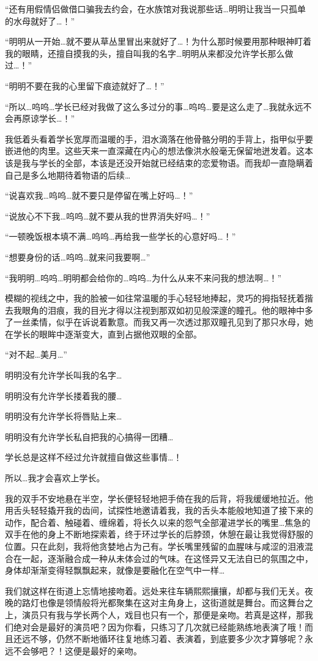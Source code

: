 “还有用假情侣做借口骗我去约会，在水族馆对我说那些话…明明让我当一只孤单的水母就好了…！”

“明明从一开始…就不要从草丛里冒出来就好了…！为什么那时候要用那种眼神盯着我的眼睛，还擅自摸我的头，擅自叫我的名字…明明从来都没允许学长那么做过…！”

“明明不要在我的心里留下痕迹就好了…！”

“所以…呜呜…学长已经对我做了这么多过分的事…呜呜…要是这么走了…我就永远不会再原谅学长…！”

我低着头看着学长宽厚而温暖的手，泪水滴落在他骨骼分明的手背上，指甲似乎要嵌进他的肉里。这些天来一直深藏在内心的想法像洪水般毫无保留地迸发着。这本该是我与学长的全部，本该是还没开始就已经结束的恋爱物语。而我却一直隐瞒着自己是多么地期待着物语的后续…

“说喜欢我…呜呜…就不要只是停留在嘴上好吗…！”

“说放心不下我…呜呜…就不要从我的世界消失好吗…！”

“一顿晚饭根本填不满…呜呜…再给我一些学长的心意好吗…！”

“想要身份的话…呜呜…就来问我要啊…”

“我明明…呜呜…明明都会给你的…呜呜…为什么从来不来问我的想法啊…！”

模糊的视线之中，我的脸被一如往常温暖的手心轻轻地捧起，灵巧的拇指轻抚着揩去我眼角的泪痕，我的目光才得以注视到那双如初见般深邃的瞳孔。他的眼神中多了一丝柔情，似乎在诉说着歉意。而我又再一次透过那双瞳孔见到了那只水母，她在学长的眼眸中逐渐变大，直到占据他双眼的全部。

“对不起…美月…”

明明没有允许学长叫我的名字…

明明没有允许学长搂着我的腰…

明明没有允许学长将唇贴上来…

明明没有允许学长私自把我的心搞得一团糟…

学长总是这样不经过允许就擅自做这些事情…！

所以…我才会喜欢上学长。

我的双手不安地悬在半空，学长便轻轻地把手倚在我的后背，将我缓缓地拉近。他用舌头轻轻撬开我的齿间，试探性地邀请着我，我的舌头本能般地知道了接下来的动作，配合着、触碰着、缠绵着，将长久以来的怨气全部灌进学长的嘴里…焦急的双手在他的身上不断地探索着，终于环过学长的后脖颈，休憩在最让我觉得舒服的位置。只在此刻，我将他贪婪地占为己有。学长嘴里残留的血腥味与咸涩的泪液混合在一起，逐渐融合成一种从未体会过的气味。在这怪异又无法自已的氛围之中，身体却渐渐变得轻飘飘起来，就像是要融化在空气中一样…

我们就这样在街道上忘情地接吻着。远处来往车辆熙熙攘攘，却都与我们无关。夜晚的路灯也像是领情般将光都聚集在这对主角身上，这街道就是舞台。而这舞台之上，演员只有我与学长两个人，戏目也只有一个，那便是亲吻。若真是这样，那我们绝对会是最好的演员吧？因为你看，只练习了几次就已经能熟练地表演了哦！而且还远不够，仍然不断地循环往复地练习着、表演着，到底要多少次才算够呢？永远不会够吧？！这便是最好的亲吻。


